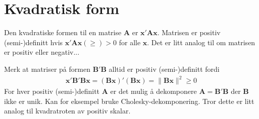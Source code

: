 \section{Kvadratisk form}
Den kvadratiske formen til en matrise $\mathbf{A}$ er $\mathbf{x}'\mathbf{A}\mathbf{x}$. Matrisen er positiv (semi-)definitt hvis $\mathbf{x}'\mathbf{A}\mathbf{x} (\geq) > 0$ for alle $\mathbf{x}$. Det er litt analog til om matrisen er positiv eller negativ...

Merk at matriser på formen $\mathbf{B}'\mathbf{B}$ alltid er positiv (semi-)definitt fordi
\begin{align}
\mathbf{x}'\mathbf{B}'\mathbf{B}\mathbf{x} = (\mathbf{B}\mathbf{x})'(\mathbf{B}\mathbf{x})=\lVert \mathbf{B}\mathbf{x}\rVert^2 \geq 0
\end{align}
For hver positiv (semi-)definitt $\mathbf{A}$ er det mulig å dekomponere $\mathbf{A}=\mathbf{B}'\mathbf{B}$ der $\mathbf{B}$ ikke er unik. Kan for eksempel bruke Cholesky-dekomponering. Tror dette er litt analog til kvadratroten av positiv skalar.